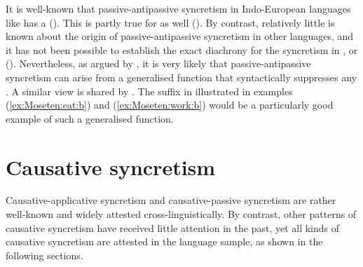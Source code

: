 \newpage

It is well-known that passive-antipassive syncretism in Indo-European languages like  has a  (). This is partly true for  as well (). By contrast, relatively little is known about the origin of passive-antipassive syncretism in other languages, and it has not been possible to establish the exact diachrony for the syncretism in ,  or  (). Nevertheless, as argued by \cite[180]{janic:2016}, it is very likely that passive-antipassive syncretism can arise from a generalised function that syntactically suppresses any . A similar view is shared by \cite[24]{malchukov:2017}. The suffix  in  illustrated in examples (\ref{ex:Moseten:eat:b}) and (\ref{ex:Moseten:work:b}) would be a particularly good example of such a generalised function.

\section{Causative syncretism} \label{sec:simple-syncretism:causative}
Causative-applicative syncretism and causative-passive syncretism are rather well-known and widely attested cross-linguistically. By contrast, other patterns of causative syncretism have received little attention in the past, yet all kinds of causative syncretism are attested in the language sample, as shown in the following sections.

